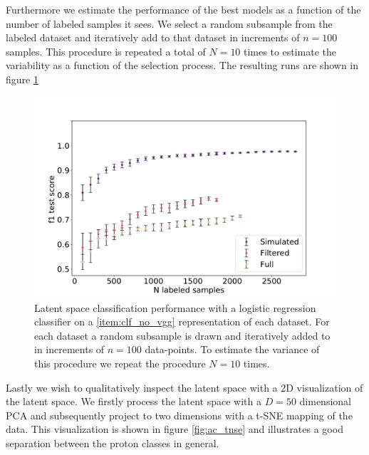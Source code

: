 \noindent Furthermore we estimate the performance of the best models as a function of the number of labeled samples it sees. We select a random subsample from the labeled dataset and iteratively add to that dataset in increments of $n=100$ samples. This procedure is repeated a total of $N=10$ times to estimate the variability as a function of the selection process. The resulting runs are shown in figure \ref{fig:ac_n_labeled}

\begin{figure}
\centering
\includegraphics[width=\textwidth]{plots/ac_n_samples.pdf}
\caption[Autoencoder performance on labeled subsets]{Latent space classification performance with a logistic regression classifier on a \ref{item:clf_no_vgg} representation of each dataset. For each dataset a random subsample is drawn and iteratively added to in increments of $n=100$ data-points. To estimate the variance of this procedure we repeat the procedure $N=10$ times.}\label{fig:ac_n_labeled}
\end{figure}

\noindent Lastly we wish to qualitatively inspect the latent space with a 2D visualization of the latent space. We firstly process the latent space with a $D=50$ dimensional PCA and subsequently project to two dimensions with a t-SNE mapping of the data. This visualization is shown in figure \ref{fig:ac_tnse} and illustrates a good separation between the proton classes in general. 

